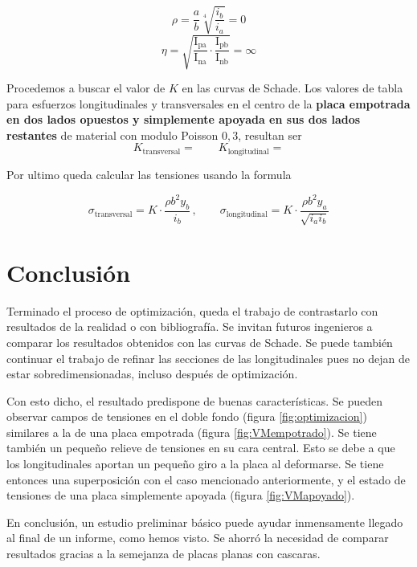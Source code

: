 \documentclass[onecolumn,10pt,titlepage]{article}
\begin{document}
\[
\rho=\frac{a}{b} \sqrt[4]{\frac{i_{b}}{i_{a}}}= 0
\]
\[
\eta=\sqrt{\frac{\mathrm{I}_{\mathrm{pa}}}{\mathrm{I}_{\mathrm{na}}} \cdot \frac{\mathrm{I}_{\mathrm{pb}}}{\mathrm{I}_{\mathrm{nb}}}} = \infty
\]

Procedemos a buscar el valor de $K$ en las curvas de Schade. Los valores de tabla para esfuerzos longitudinales y transversales en el centro de la \textbf{placa empotrada en dos lados opuestos y simplemente apoyada en sus dos lados restantes} de material con modulo Poisson $0,3$, resultan ser
\[
K_{\textrm{transversal}}=  \qquad K_{\textrm{longitudinal}}=
\] 

Por ultimo queda calcular las tensiones usando la formula

\[
\sigma_{\textrm{transversal}}= K \cdot \frac{\rho b^2y_b }{i_b} \, , \qquad \sigma_{\textrm{longitudinal}}= K \cdot \frac{\rho b^2y_a }{\sqrt{i_a i_b}}
\]












\section{Conclusión}
Terminado el proceso de optimización, queda el trabajo de contrastarlo con resultados de la realidad o con bibliografía. Se invitan futuros ingenieros a comparar los resultados obtenidos con las curvas de Schade\citep{dominguez1969calculo}. Se puede también continuar el trabajo de refinar las secciones de las longitudinales pues no dejan de estar sobredimensionadas, incluso después de optimización. 

Con esto dicho, el resultado predispone de buenas características. Se pueden observar campos de tensiones en el doble fondo (figura \ref{fig:optimizacion}) similares a la de una placa empotrada (figura \ref{fig:VMempotrado}). Se tiene también un pequeño relieve de tensiones en su cara central. Esto se debe a que los longitudinales aportan un pequeño giro a la placa al deformarse. Se tiene entonces una superposición con el caso mencionado anteriormente, y el estado de tensiones de una placa simplemente apoyada (figura \ref{fig:VMapoyado}).

En conclusión, un estudio preliminar básico puede ayudar inmensamente llegado al final de un informe, como hemos visto. Se ahorró la necesidad de comparar resultados gracias a la semejanza de placas planas con cascaras.



\clearpage
 
\end{document}
